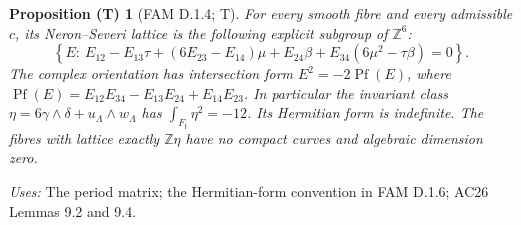 \documentclass[11pt,a4paper]{article}
\theoremstyle{plain}
\newtheorem{proposition}[theorem]{Proposition (T)}
\theoremstyle{definition}
\begin{document}
\begin{proposition}[FAM D.1.4; T]\label{fam:D.1.4}
For every smooth fibre and every admissible \(c\), its Neron--Severi lattice
is the following explicit subgroup of \(\mathbb Z^6\):
\begin{equation}\label{fam:eq:cd-NS}
 \left\{E:\ E_{12}-E_{13}\tau+(6E_{23}-E_{14})\mu+
 E_{24}\beta+E_{34}(6\mu^2-\tau\beta)=0\right\}.
\end{equation}
The complex orientation has intersection form
\(E^2=-2\operatorname{Pf}(E)\), where
\(\operatorname{Pf}(E)=E_{12}E_{34}-E_{13}E_{24}+E_{14}E_{23}\).
In particular the invariant class \(\eta=6\gamma\wedge\delta+u_{\Lambda}\wedge w_{\Lambda}\)
has \(\int_{F_t}\eta^2=-12\). Its Hermitian form is indefinite.
The fibres with lattice exactly \(\mathbb Z\eta\) have no compact curves
and algebraic dimension zero.
\end{proposition}
\noindent\emph{Uses:} The period matrix; the Hermitian-form convention in FAM D.1.6; AC26 Lemmas 9.2 and 9.4.\par
\end{document}
